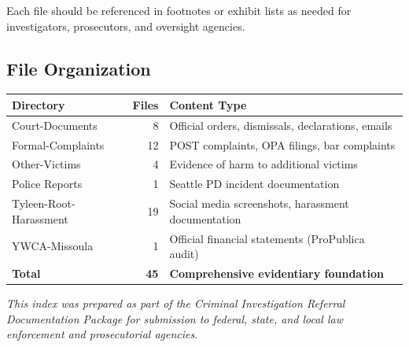\documentclass[11pt, letterpaper]{article}
\begin{document}
Each file should be referenced in footnotes or exhibit lists as needed for investigators, prosecutors, and oversight agencies.

\subsection{File Organization}

\begin{table}[h]
\centering
\begin{tabular}{|l|r|p{3in}|}
\hline
\textbf{Directory} & \textbf{Files} & \textbf{Content Type} \\
\hline
Court-Documents & 8 & Official orders, dismissals, declarations, emails \\
\hline
Formal-Complaints & 12 & POST complaints, OPA filings, bar complaints \\
\hline
Other-Victims & 4 & Evidence of harm to additional victims \\
\hline
Police Reports & 1 & Seattle PD incident documentation \\
\hline
Tyleen-Root-Harassment & 19 & Social media screenshots, harassment documentation \\
\hline
YWCA-Missoula & 1 & Official financial statements (ProPublica audit) \\
\hline
\textbf{Total} & \textbf{45} & \textbf{Comprehensive evidentiary foundation} \\
\hline
\end{tabular}
\end{table}

\vspace{0.5in}

\textit{This index was prepared as part of the Criminal Investigation Referral Documentation Package for submission to federal, state, and local law enforcement and prosecutorial agencies.}

\vfill
\end{document}
